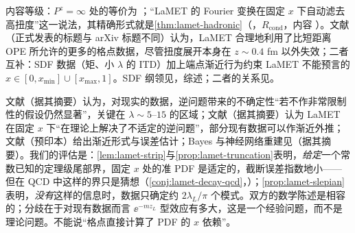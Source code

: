 内容等级：$P^z=\infty$ 处的等价为 \tagA；“LaMET 的 Fourier 变换在固定 $x$ 下自动滤去高扭度”这一说法\cite{Ji:2022ezo}，其精确形式就是\cref{thm:lamet-hadronic}（\tagR，$R_{\mathrm{cond}}$，内容 \tagC）。文献\cite{Ji:2022ezo}（正式发表的标题与 arXiv 标题不同）认为，LaMET 合理地利用了比短距离 OPE 所允许的更多的格点数据，尽管扭度展开本身在 $z\sim0.4$ fm 以外失效；二者互补：SDF 数据（矩、小 $\lambda$ 的 ITD）加上端点渐近行为约束 LaMET 不能预言的 $x\in[0,x_{\min}]\cup[x_{\max},1]$。SDF 纲领见\cite{Radyushkin2017,Radyushkin:2017lvu,Radyushkin:2018cvn,Orginos:2017kos,Karpie:2018zaz,Joo:2019jct,Joo:2020spy}，综述\cite{Radyushkin:2019mye}；二者的关系见\cite{IzubuchiEtAl2018}。

\begin{remark}\label{rem:lamet-inverse-problem}
文献\cite{Dutrieux:2025jed}（据其摘要）认为，对现实的数据，逆问题带来的不确定性“若不作非常限制性的假设仍然显著”，关键在 $\lambda\sim5$--$15$ 的区域；文献\cite{Chen:2025cxr}（据其摘要）认为 LaMET 在固定 $x$ 下“在理论上解决了不适定的逆问题”，部分现有数据可以作渐近外推；文献\cite{Ji:2026vir}（预印本）给出渐近形式与误差估计；Bayes 与神经网络重建见\cite{Karpie:2019eiq}（据其摘要）。我们的评估是：\cref{lem:lamet-strip}与\cref{prop:lamet-truncation}表明，\emph{给定}一个常数已知的定理级尾部界，固定 $x$ 处的准 PDF 是适定的，截断误差指数地小——但在 QCD 中这样的界只是猜想（\cref{conj:lamet-decay-qcd}，\tagC）；\cref{prop:lamet-slepian}表明，\emph{没有}这样的信息时，数据只确定约 $2\lambda_L/\pi$ 个模式。双方的数学陈述是相容的；分歧在于对现有数据而言 $\ee^{-mz_L}$ 型效应有多大，这是一个经验问题，而不是理论问题。不能说“格点直接计算了 PDF 的 $x$ 依赖”。
\end{remark}
